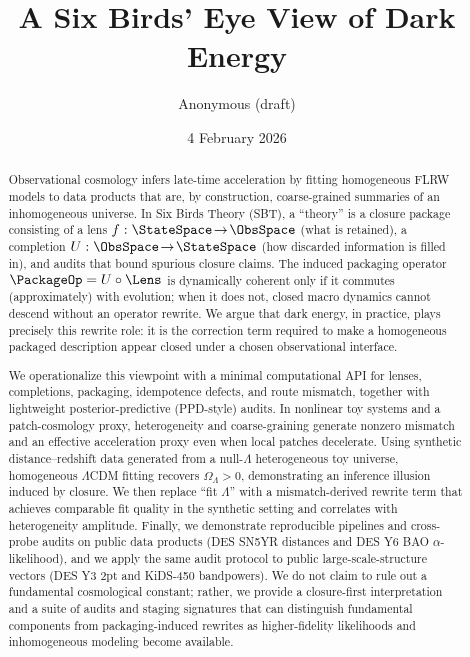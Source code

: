 \documentclass[11pt]{article}
\title{A Six Birds' Eye View of Dark Energy}
\author{Anonymous (draft)}
\date{4 February 2026}
\theoremstyle{definition}
\theoremstyle{plain}
\theoremstyle{remark}
\begin{document}
\maketitle
\thispagestyle{firstpage}

\begin{abstract}
Observational cosmology infers late-time acceleration by fitting homogeneous FLRW models to data products that are, by construction, coarse-grained summaries of an inhomogeneous universe. In Six Birds Theory (SBT), a ``theory'' is a closure package consisting of a lens $f:\StateSpace\!\to\!\ObsSpace$ (what is retained), a completion $U:\ObsSpace\!\to\!\StateSpace$ (how discarded information is filled in), and audits that bound spurious closure claims. The induced packaging operator $\PackageOp = U\circ \Lens$ is dynamically coherent only if it commutes (approximately) with evolution; when it does not, closed macro dynamics cannot descend without an operator rewrite. We argue that dark energy, in practice, plays precisely this rewrite role: it is the correction term required to make a homogeneous packaged description appear closed under a chosen observational interface.

We operationalize this viewpoint with a minimal computational API for lenses, completions, packaging, idempotence defects, and route mismatch, together with lightweight posterior-predictive (PPD-style) audits. In nonlinear toy systems and a patch-cosmology proxy, heterogeneity and coarse-graining generate nonzero mismatch and an effective acceleration proxy even when local patches decelerate. Using synthetic distance--redshift data generated from a null-$\Lambda$ heterogeneous toy universe, homogeneous $\Lambda$CDM fitting recovers $\Omega_\Lambda>0$, demonstrating an inference illusion induced by closure. We then replace ``fit $\Lambda$'' with a mismatch-derived rewrite term that achieves comparable fit quality in the synthetic setting and correlates with heterogeneity amplitude. Finally, we demonstrate reproducible pipelines and cross-probe audits on public data products (DES SN5YR distances and DES Y6 BAO $\alpha$-likelihood), and we apply the same audit protocol to public large-scale-structure vectors (DES Y3 2pt and KiDS-450 bandpowers). We do not claim to rule out a fundamental cosmological constant; rather, we provide a closure-first interpretation and a suite of audits and staging signatures that can distinguish fundamental components from packaging-induced rewrites as higher-fidelity likelihoods and inhomogeneous modeling become available.
\end{abstract}
\end{document}
